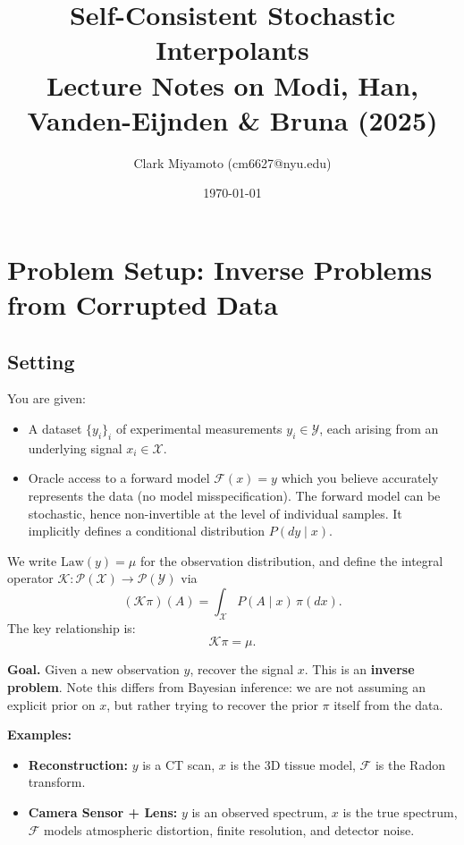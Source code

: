 \documentclass[12pt,fleqn]{article}
\title{Self-Consistent Stochastic Interpolants \\ 
\large Lecture Notes on Modi, Han, Vanden-Eijnden \& Bruna (2025)}
\author{Clark Miyamoto (cm6627@nyu.edu)}
\date{\today}
\numberwithin{equation}{section}
\newcommand{\X}{\mathcal{X}}
\newcommand{\Y}{\mathcal{Y}}
\newcommand{\Law}{\mathrm{Law}}
\begin{document}
\maketitle

\tableofcontents
\newpage

\section{Problem Setup: Inverse Problems from Corrupted Data}

\subsection{Setting}
You are given:
\begin{itemize}
	\item A dataset $\{y_i\}_i$ of experimental measurements $y_i \in \Y$, each arising from an underlying signal $x_i \in \X$.
	\item Oracle access to a forward model $\mathcal F(x) = y$ which you believe accurately represents the data (no model misspecification). The forward model can be stochastic, hence non-invertible at the level of individual samples. It implicitly defines a conditional distribution $P(dy \mid x)$.
\end{itemize}
We write $\Law(y) = \mu$ for the observation distribution, and define the integral operator $\mathcal K : \mathcal P(\X) \to \mathcal P(\Y)$ via
\[
	(\mathcal K \pi)(A) = \int_\X P(A \mid x) \, \pi(dx).
\]
The key relationship is:
\begin{equation}
	\mathcal K \pi = \mu. \label{eq:forward}
\end{equation}

\noindent\textbf{Goal.} Given a new observation $y$, recover the signal $x$. This is an \textbf{inverse problem}. Note this differs from Bayesian inference: we are not assuming an explicit prior on $x$, but rather trying to recover the prior $\pi$ itself from the data.

\begin{sidework}
\noindent\textbf{Examples:}
\begin{itemize}
	\item \textbf{Reconstruction:} $y$ is a CT scan, $x$ is the 3D tissue model, $\mathcal F$ is the Radon transform.
	\item \textbf{Camera Sensor + Lens:} $y$ is an observed spectrum, $x$ is the true spectrum, $\mathcal F$ models atmospheric distortion, finite resolution, and detector noise.
\end{itemize}
\end{sidework}
\end{document}
